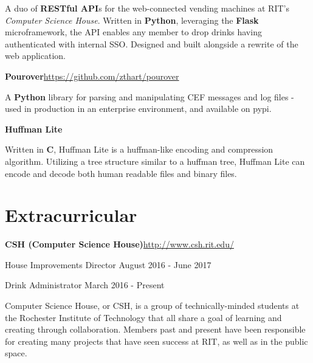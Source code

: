 \documentclass[margin,line]{resume}
\newcommand{\rurl}[1]{\hfill {\footnotesize \url{#1}}}
\begin{document}
\begin{resume}
\begin{asparablank}
        \small A duo of \textbf{RESTful API}s for the web-connected vending machines at RIT's 
        \textit{Computer Science House}. Written in \textbf{Python}, leveraging the \textbf{Flask} microframework, 
        the API enables any member to drop drinks having authenticated with internal SSO. Designed and built 
        alongside a rewrite of the web application.
        \\
		\item {\bf Pourover}\rurl{https://github.com/zthart/pourover}

		\small A \textbf{Python} library for parsing and manipulating CEF messages and log files - used in production in 
        an enterprise environment, and available on pypi.
		\normalsize
		\\
		\item {\bf Huffman Lite}

		\small Written in \textbf{C}, Huffman Lite is a huffman-like encoding and compression algorithm. Utilizing a 
        tree structure similar to a huffman tree, Huffman Lite can encode and decode both human readable files and 
        binary files.
		\normalsize
	\end{asparablank}

\section{\mysidestyle Extracurricular}
	\begin{asparablank}
		\item {\bf CSH ({\small Computer Science House})}\rurl{http://www.csh.rit.edu/}
		\small	\item House Improvements Director \hfill August 2016 - June 2017
        \small  \item Drink Administrator \hfill March 2016 - Present
        \linebreak

        \small Computer Science House, or CSH, is a group of technically-minded students at the Rochester Institute of Technology that all share a goal of learning and creating through collaboration. Members past and present have been responsible for creating many projects that have seen success at RIT, as well as in the public space.
	\end{asparablank}


\end{resume}
\end{document}
